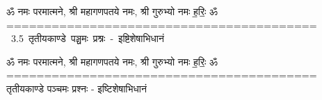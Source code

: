 \documentclass[17pt]{extarticle}
\begin{document}
\begin{titlepage}
    \begin{center}
 
\begin{sanskrit}
    { \Large
    ॐ नमः परमात्मने, श्री महागणपतये नमः, श्री गुरुभ्यो नमः
ह॒रिः॒ ॐ
========================================= 
    }
    \\
    \vspace{2.5cm}
    \mbox{ \Huge
    3.5      तृतीयकाण्डे पञ्चमः प्रश्नः - इष्टिशेषाभिधानं   }
\end{sanskrit}
\end{center}

\end{titlepage}
\tableofcontents

ॐ नमः परमात्मने, श्री महागणपतये नमः, श्री गुरुभ्यो नमः
ह॒रिः॒ ॐ
=========================================       तृतीयकाण्डे पञ्चमः प्रश्नः - इष्टिशेषाभिधानं \newline

\end{document}
